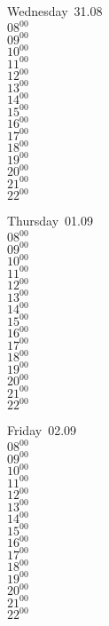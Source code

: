 \documentclass[11pt,a4paper]{book}\usepackage[]{graphicx}\usepackage[]{color}
\begin{document}
\begin{weekdaybox}
  Wednesday~31.08\\
  { 
  \vfill
  $08^{00}$\\
$09^{00}$\\
$10^{00}$\\
$11^{00}$\\
$12^{00}$\\
$13^{00}$\\
$14^{00}$\\
$15^{00}$\\
$16^{00}$\\
$17^{00}$\\
$18^{00}$\\
$19^{00}$\\
$20^{00}$\\
$21^{00}$\\
$22^{00}$\\
  }
\end{weekdaybox}
\clearpage
\begin{headerbox}
\end{headerbox}
\begin{weekdaybox}
  Thursday~01.09\\
  { 
  \vfill
  $08^{00}$\\
$09^{00}$\\
$10^{00}$\\
$11^{00}$\\
$12^{00}$\\
$13^{00}$\\
$14^{00}$\\
$15^{00}$\\
$16^{00}$\\
$17^{00}$\\
$18^{00}$\\
$19^{00}$\\
$20^{00}$\\
$21^{00}$\\
$22^{00}$\\
  }
\end{weekdaybox} 
\begin{weekdaybox}
  Friday~02.09\\
  { 
  \vfill
  $08^{00}$\\
$09^{00}$\\
$10^{00}$\\
$11^{00}$\\
$12^{00}$\\
$13^{00}$\\
$14^{00}$\\
$15^{00}$\\
$16^{00}$\\
$17^{00}$\\
$18^{00}$\\
$19^{00}$\\
$20^{00}$\\
$21^{00}$\\
$22^{00}$\\
  }
\end{weekdaybox}
\end{document}
